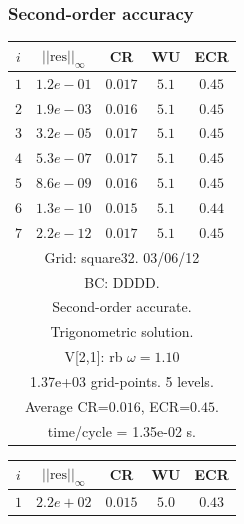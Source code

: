 \renewcommand{\tablefontsize}{\footnotesize}
\clearpage
\subsubsection{Second-order accuracy}

\begin{table}[hbt]
\begin{center}
{\tablefontsize
\begin{tabular}{|c|c|c|c|c|} \hline 
 $i$   & $\vert\vert\mbox{res}\vert\vert_\infty$  &  CR     &  WU    & ECR  \\   \hline 
 $ 1$  & $ 1.2e-01$ & $0.017$ & $ 5.1$ & $0.45$ \\ 
 $ 2$  & $ 1.9e-03$ & $0.016$ & $ 5.1$ & $0.45$ \\ 
 $ 3$  & $ 3.2e-05$ & $0.017$ & $ 5.1$ & $0.45$ \\ 
 $ 4$  & $ 5.3e-07$ & $0.017$ & $ 5.1$ & $0.45$ \\ 
 $ 5$  & $ 8.6e-09$ & $0.016$ & $ 5.1$ & $0.45$ \\ 
 $ 6$  & $ 1.3e-10$ & $0.015$ & $ 5.1$ & $0.44$ \\ 
 $ 7$  & $ 2.2e-12$ & $0.017$ & $ 5.1$ & $0.45$ \\ 
\hline 
\multicolumn{5}{|c|}{Grid: square32. 03/06/12}  \\
\multicolumn{5}{|c|}{BC: DDDD.}  \\
\multicolumn{5}{|c|}{Second-order accurate.}  \\
\multicolumn{5}{|c|}{Trigonometric solution.}  \\
\multicolumn{5}{|c|}{V[2,1]: rb $\omega=1.10$}  \\
\multicolumn{5}{|c|}{1.37e+03 grid-points. 5 levels.}  \\
\multicolumn{5}{|c|}{Average CR=$0.016$, ECR=$0.45$.}  \\
\multicolumn{5}{|c|}{time/cycle = 1.35e-02 s.}  \\
\hline 
\end{tabular}
\begin{tabular}{|c|c|c|c|c|} \hline 
 $i$   & $\vert\vert\mbox{res}\vert\vert_\infty$  &  CR     &  WU    & ECR  \\   \hline 
 $ 1$  & $ 2.2e+02$ & $0.015$ & $ 5.0$ & $0.43$ \\ 

\end{tabular}}
\end{center}
\end{table}

